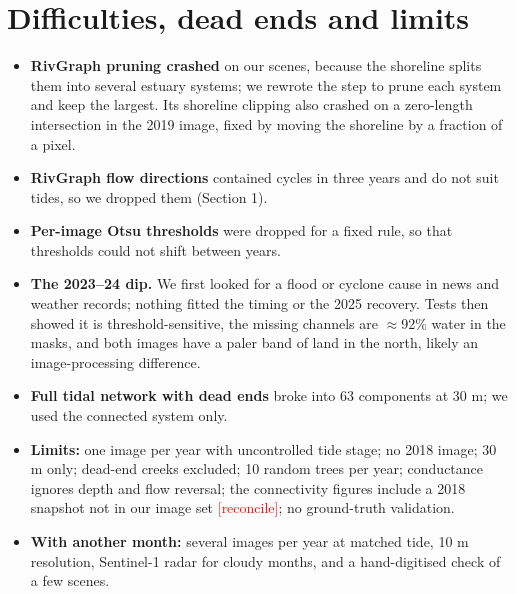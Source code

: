 \documentclass[11pt,a4paper]{article}
\newcommand{\todo}[1]{\textcolor{red}{[#1]}}
\begin{document}
\section{Difficulties, dead ends and limits}
\begin{itemize}
  \item \textbf{RivGraph pruning crashed} on our scenes, because the shoreline splits them into several estuary systems; we rewrote the step to prune each system and keep the largest. Its shoreline clipping also crashed on a zero-length intersection in the 2019 image, fixed by moving the shoreline by a fraction of a pixel.
  \item \textbf{RivGraph flow directions} contained cycles in three years and do not suit tides, so we dropped them (Section 1).
  \item \textbf{Per-image Otsu thresholds} were dropped for a fixed rule, so that thresholds could not shift between years.
  \item \textbf{The 2023--24 dip.} We first looked for a flood or cyclone cause in news and weather records; nothing fitted the timing or the 2025 recovery. Tests then showed it is threshold-sensitive, the missing channels are $\approx$92\% water in the masks, and both images have a paler band of land in the north, likely an image-processing difference.
  \item \textbf{Full tidal network with dead ends} broke into 63 components at 30 m; we used the connected system only.
  \item \textbf{Limits:} one image per year with uncontrolled tide stage; no 2018 image; 30 m only; dead-end creeks excluded; 10 random trees per year; conductance ignores depth and flow reversal; the connectivity figures include a 2018 snapshot not in our image set \todo{reconcile}; no ground-truth validation.
  \item \textbf{With another month:} several images per year at matched tide, 10 m resolution, Sentinel-1 radar for cloudy months, and a hand-digitised check of a few scenes.
\end{itemize}
\end{document}
